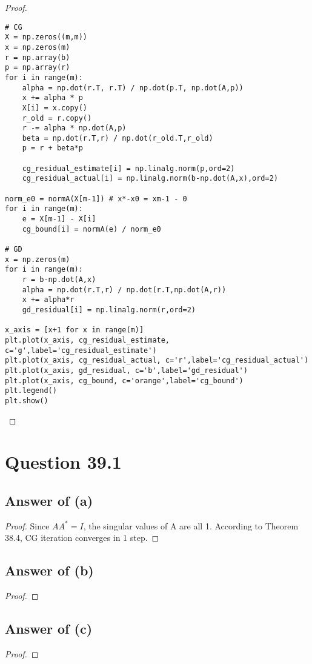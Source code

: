 \documentclass[letterpaper,11pt\iffalse ,draft\fi]{article}
\begin{document}
\begin{proof}
\begin{lstlisting}
# CG
X = np.zeros((m,m))
x = np.zeros(m)
r = np.array(b)
p = np.array(r)
for i in range(m):
    alpha = np.dot(r.T, r.T) / np.dot(p.T, np.dot(A,p))
    x += alpha * p
    X[i] = x.copy()
    r_old = r.copy()
    r -= alpha * np.dot(A,p)
    beta = np.dot(r.T,r) / np.dot(r_old.T,r_old)
    p = r + beta*p

    cg_residual_estimate[i] = np.linalg.norm(p,ord=2)
    cg_residual_actual[i] = np.linalg.norm(b-np.dot(A,x),ord=2)

norm_e0 = normA(X[m-1]) # x*-x0 = xm-1 - 0
for i in range(m):
    e = X[m-1] - X[i]
    cg_bound[i] = normA(e) / norm_e0

# GD
x = np.zeros(m)
for i in range(m):
    r = b-np.dot(A,x)
    alpha = np.dot(r.T,r) / np.dot(r.T,np.dot(A,r))
    x += alpha*r
    gd_residual[i] = np.linalg.norm(r,ord=2)

x_axis = [x+1 for x in range(m)]
plt.plot(x_axis, cg_residual_estimate, c='g',label='cg_residual_estimate')
plt.plot(x_axis, cg_residual_actual, c='r',label='cg_residual_actual')
plt.plot(x_axis, gd_residual, c='b',label='gd_residual')
plt.plot(x_axis, cg_bound, c='orange',label='cg_bound')
plt.legend()
plt.show()
\end{lstlisting}

\end{proof}


\newpage

\section*{Question 39.1}

\subsection*{Answer of (a)}
\begin{proof}

Since $AA^*=I$, the singular values of A are all 1. According to Theorem 38.4, CG iteration converges in 1 step.

\end{proof}


\subsection*{Answer of (b)}
\begin{proof}
\end{proof}


\subsection*{Answer of (c)}
\begin{proof}
\end{proof}






\end{document}
